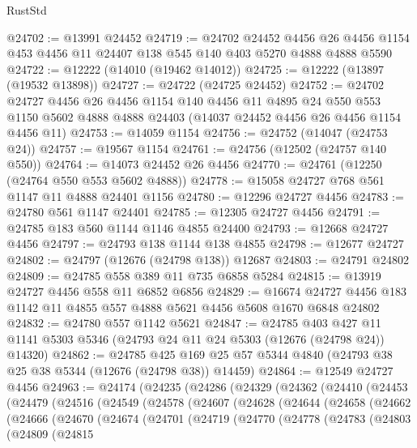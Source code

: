 \begin{lexlean}{RustStd}
\begin{coremodule}
@24702 := @13991 @24452
@24719 := @24702
    @24452
    @4456
    @26
    @4456
    @1154
    @453
    @4456
    @11
    @24407
    @138
    @545
    @140
    @403
    @5270
    @4888
    @4888
    @5590
@24722 := @12222 (@14010 (@19462 @14012))
@24725 := @12222 (@13897 (@19532 @13898))
@24727 := @24722 (@24725 @24452)
@24752 := @24702
    @24727
    @4456
    @26
    @4456
    @1154
    @140
    @4456
    @11
    @4895
    @24
    @550
    @553
    @1150
    @5602
    @4888
    @4888
    @24403
    (@14037 @24452 @4456 @26 @4456 @1154 @4456 @11)
@24753 := @14059 @1154
@24756 := @24752 (@14047 (@24753 @24))
@24757 := @19567 @1154
@24761 := @24756 (@12502 (@24757 @140 @550))
@24764 := @14073 @24452 @26 @4456
@24770 := @24761 (@12250 (@24764 @550 @553 @5602 @4888))
@24778 := @15058 @24727 @768 @561 @1147 @11 @4888 @24401 @1156
@24780 := @12296 @24727 @4456
@24783 := @24780 @561 @1147 @24401
@24785 := @12305 @24727 @4456
@24791 := @24785 @183 @560 @1144 @1146 @4855 @24400
@24793 := @12668 @24727 @4456
@24797 := @24793 @138 @1144 @138 @4855
@24798 := @12677 @24727
@24802 := @24797 (@12676 (@24798 @138)) @12687
@24803 := @24791 @24802
@24809 := @24785 @558 @389 @11 @735 @6858 @5284
@24815 := @13919 @24727 @4456 @558 @11 @6852 @6856
@24829 := @16674 @24727 @4456 @183 @1142 @11 @4855 @557 @4888 @5621 @4456 @5608 @1670 @6848 @24802
@24832 := @24780 @557 @1142 @5621
@24847 := @24785
    @403
    @427
    @11
    @1141
    @5303
    @5346
    (@24793 @24 @11 @24 @5303 (@12676 (@24798 @24)) @14320)
@24862 := @24785
    @425
    @169
    @25
    @57
    @5344
    @4840
    (@24793 @38 @25 @38 @5344 (@12676 (@24798 @38)) @14459)
@24864 := @12549 @24727 @4456
@24963 := @24174
    (@24235
      (@24286
        (@24329
          (@24362
            (@24410
              (@24453
                (@24479
                  (@24516
                    (@24549
                      (@24578
                        (@24607
                          (@24628
                            (@24644
                              (@24658
                                (@24662
                                  (@24666
                                    (@24670
                                      (@24674
                                        (@24701
                                          (@24719
                                            (@24770
                                              (@24778
                                                (@24783
                                                  (@24803
                                                    (@24809
                                                      (@24815

\end{coremodule}
\end{lexlean}
